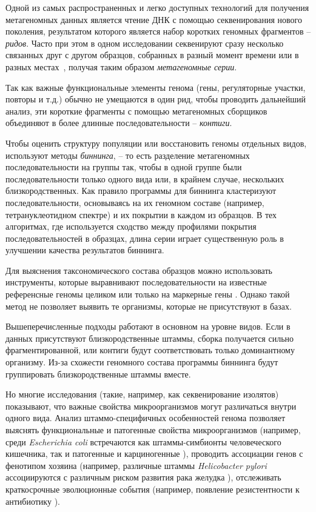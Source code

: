 \documentclass{spbau-diploma}
\begin{document}
Одной из самых распространенных и легко доступных технологий для получения метагеномных данных является чтение ДНК с помощью секвенирования нового поколения, результатом которого является набор коротких геномных фрагментов -- \textit{ридов}. Часто при этом в одном исследовании секвенируют сразу несколько связанных друг с другом образцов, собранных в разный момент времени \cite{time_series} или в разных местах~\cite{spacial_series_1, spacial_series_2}, получая таким образом \textit{метагеномные серии}.

Так как важные функциональные элементы генома (гены, регуляторные участки, повторы и т.д.) обычно не умещаются в один рид, чтобы проводить дальнейший анализ, эти короткие фрагменты с помощью метагеномных сборщиков \cite{IDBA-UD, MEGAHIT, MetaVelvet, RayMeta, MetaSpades} объединяют в более длинные последовательности -- \textit{контиги}. 

Чтобы оценить структуру популяции или восстановить геномы отдельных видов, используют методы \textit{биннинга}, -- то есть разделение метагеномных последовательности на группы так, чтобы в одной группе были последовательности только одного вида или, в крайнем случае, нескольких близкородственных. Как правило программы для биннинга \cite{CONCOCT, GroopM, MyCC, MetaBAT} кластеризуют последовательности, основываясь на их геномном составе (например, тетрануклеотидном спектре) и их покрытии в каждом из образцов. В тех алгоритмах, где используется сходство между профилями покрытия последовательностей в образцах, длина серии играет существенную роль в улучшении качества результатов биннинга.

Для выяснения таксономического состава образцов можно использовать инструменты, которые выравнивают последовательности на известные референсные геномы целиком \cite{GOTTCHA, CLARK, Kraken} или только на маркерные гены \cite{MetaPhlAn2, mOTU}. Однако такой метод не позволяет выявить те организмы, которые не присутствуют в базах.

Вышеперечисленные подходы работают в основном на уровне видов. Если в данных присутствуют близкородственные штаммы, сборка получается сильно фрагментированной, или контиги будут соответствовать только доминантному организму. Из-за схожести геномного состава программы биннинга будут группировать близкородственные штаммы вместе. 

Но многие исследования (такие, например, как секвенирование изолятов) показывают, что важные свойства микроорганизмов могут различаться внутри одного вида. Анализ штаммо-специфичных особенностей генома позволяет выяснять функциональные и патогенные свойства микроорганизмов (например, среди \textit{Escherichia coli} встречаются как штаммы-симбионты человеческого кишечника, так и патогенные \cite{patogen_ecoli} и карциногенные \cite{carcinogenic_ecoli}), проводить ассоциации генов с фенотипом хозяина (например, различные штаммы  \textit{Helicobacter pylori} ассоциируются с различным риском развития  рака желудка \cite{cancer_example}), отслеживать краткосрочные эволюционные события (например, появление резистентности к антибиотику \cite{antibitics_resistance}).
\end{document}
